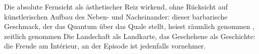 Die absolute Fernsicht als ästhetischer Reiz wirkend, ohne Rücksicht auf künstlerischen Aufbau des Neben- und Nacheinander: dieser barbarische Geschmack, der das Quantum über das Quale stellt, heisst räumlich genommen , zeitlich genommen  Die Landschaft als Landkarte, das Geschehene als Geschichte: die Freude am Intérieur, an der Episode ist jedenfalls vornehmer.
\par

